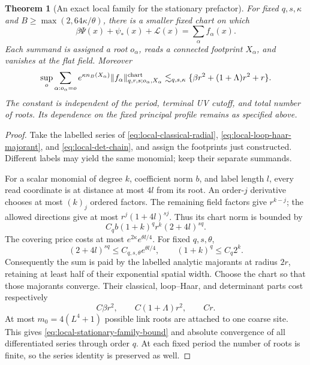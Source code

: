 \documentclass[11pt,reqno]{amsart}
\numberwithin{equation}{section}
\newtheorem{theorem}{Theorem}[section]
\theoremstyle{definition}
\theoremstyle{remark}
\begin{document}
\begin{theorem}[An exact local family for the stationary prefactor]
\label{thm:local-stationary-family}
For fixed \(q,s,\kappa\) and
\(B\ge\max(2,64\kappa/\theta)\), there is a
smaller fixed chart on which
\begin{equation}
       \beta\Psi(x)+\psi_*(x)+\mathcal L(x)
                            =\sum_\alpha f_\alpha(x).
 \label{eq:local-stationary-family}
\end{equation}
Each summand is assigned a root \(o_\alpha\),
reads a connected footprint \(X_\alpha\), and
vanishes at the flat field. Moreover
\begin{equation}
 \sup_o\sum_{\alpha:o_\alpha=o}
      e^{\kappa n_B(X_\alpha)}
      \|f_\alpha\|^{\rm chart}_{q,r,s;o_\alpha,X_\alpha}
       \lesssim_{q,s,\kappa}
                 \{\beta r^2+(1+\Lambda)r^2+r\}.
 \label{eq:local-stationary-family-bound}
\end{equation}
The constant is independent of the period, terminal
UV cutoff, and total number of roots.
Its dependence on the fixed principal profile remains
as specified above.
\end{theorem}
\begin{proof}
Take the labelled series of
\eqref{eq:local-classical-radial},
\eqref{eq:local-loop-haar-majorant}, and
\eqref{eq:local-det-chain}, and assign the
footprints just constructed.
Different labels may yield the same monomial;
keep their separate summands.

For a scalar monomial of degree \(k\), coefficient
norm \(b\), and label length \(l\), every read
coordinate is at distance at most \(4l\) from its
root. An order-\(j\) derivative chooses at most
\((k)_j\) ordered factors.
The remaining field factors give \(r^{k-j}\);
the allowed directions give at most
\(r^j(1+4l)^{sj}\).
Thus its chart norm is bounded by
\[
                    C_qb(1+k)^q r^k(2+4l)^{sq}.
\]
The covering price costs at most
\(e^{2\kappa}e^{\theta l/4}\).
For fixed \(q,s,\theta\),
\[
        (2+4l)^{sq}\le C_{q,s,\theta}e^{\theta l/4},
        \qquad (1+k)^q\le C_q2^k .
\]
Consequently the sum is paid by the labelled
analytic majorants at radius \(2r\), retaining
at least half of their exponential spatial width.
Choose the chart so that those majorants converge.
Their classical, loop--Haar, and determinant
parts cost respectively
\[
                  C\beta r^2,\qquad
                  C(1+\Lambda)r^2,\qquad Cr .
\]
At most \(m_0=4(L^4+1)\) possible link roots
are attached to one coarse site.
This gives \eqref{eq:local-stationary-family-bound}
and absolute convergence of all differentiated
series through order \(q\).
At each fixed period the number of roots is
finite, so the series identity is preserved as well.
\end{proof}
\end{document}
